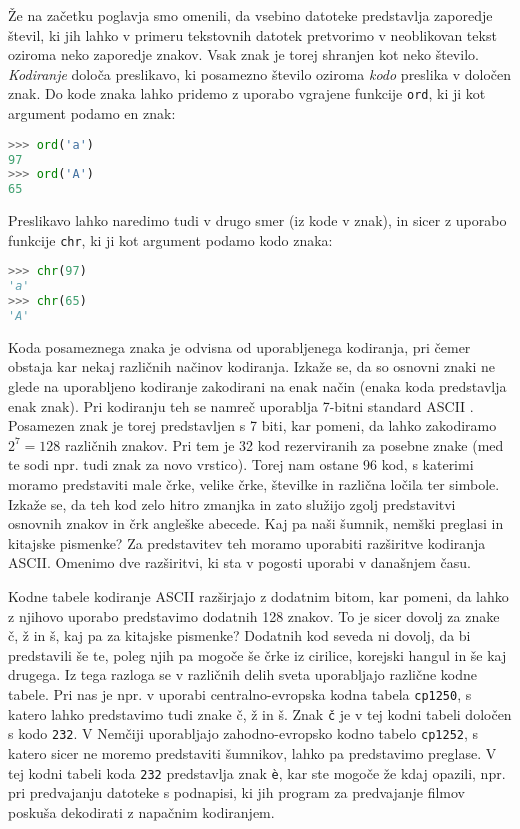 Že na začetku poglavja smo omenili, da vsebino datoteke predstavlja zaporedje števil, ki jih lahko v primeru tekstovnih datotek pretvorimo v neoblikovan tekst oziroma neko zaporedje znakov. Vsak znak je torej shranjen kot neko število. \emph{Kodiranje} določa preslikavo, ki posamezno število oziroma \emph{kodo} preslika v določen znak. Do kode znaka lahko pridemo z uporabo vgrajene funkcije \texttt{ord}, ki ji kot argument podamo en znak:
\begin{lstlisting}[language=Python, showstringspaces=false]
>>> ord('a')
97
>>> ord('A')
65
\end{lstlisting}
Preslikavo lahko naredimo tudi v drugo smer (iz kode v znak), in sicer z uporabo funkcije \texttt{chr}, ki ji kot argument podamo kodo znaka:
\begin{lstlisting}[language=Python, showstringspaces=false]
>>> chr(97)
'a'
>>> chr(65)
'A'
\end{lstlisting}

Koda posameznega znaka je odvisna od uporabljenega kodiranja, pri čemer obstaja kar nekaj različnih načinov kodiranja. Izkaže se, da so osnovni znaki ne glede na uporabljeno kodiranje zakodirani na enak način (enaka koda predstavlja enak znak). Pri kodiranju teh se namreč uporablja 7-bitni standard ASCII . Posamezen znak je torej predstavljen s 7 biti, kar pomeni, da lahko zakodiramo $2^7=128$ različnih znakov. Pri tem je 32 kod rezerviranih za posebne znake (med te sodi npr. tudi znak za novo vrstico). Torej nam ostane 96 kod, s katerimi moramo predstaviti male črke, velike črke, številke in različna ločila ter simbole. Izkaže se, da teh kod zelo hitro zmanjka in zato služijo zgolj predstavitvi osnovnih znakov in črk angleške abecede. Kaj pa naši šumnik, nemški preglasi in kitajske pismenke? Za predstavitev teh moramo uporabiti razširitve kodiranja ASCII. Omenimo dve razširitvi, ki sta v pogosti uporabi v današnjem času. 

Kodne tabele  kodiranje ASCII razširjajo z dodatnim bitom, kar pomeni, da lahko z njihovo uporabo predstavimo dodatnih 128 znakov. To je sicer dovolj za znake č, ž in š, kaj pa za kitajske pismenke? Dodatnih kod seveda ni dovolj, da bi predstavili še te, poleg njih pa mogoče še črke iz cirilice, korejski hangul in še kaj drugega. Iz tega razloga se v različnih delih sveta uporabljajo različne kodne tabele. Pri nas je npr. v uporabi centralno-evropska kodna tabela \texttt{cp1250}, s katero lahko predstavimo tudi znake č, ž in š. Znak \texttt{č} je v tej kodni tabeli določen s kodo \texttt{232}. V Nemčiji uporabljajo zahodno-evropsko kodno tabelo \texttt{cp1252}, s katero sicer ne moremo predstaviti šumnikov, lahko pa predstavimo preglase. V tej kodni tabeli koda \texttt{232} predstavlja znak \texttt{è}, kar ste mogoče že kdaj opazili, npr. pri predvajanju datoteke s podnapisi, ki jih program za predvajanje filmov poskuša dekodirati z napačnim kodiranjem.

